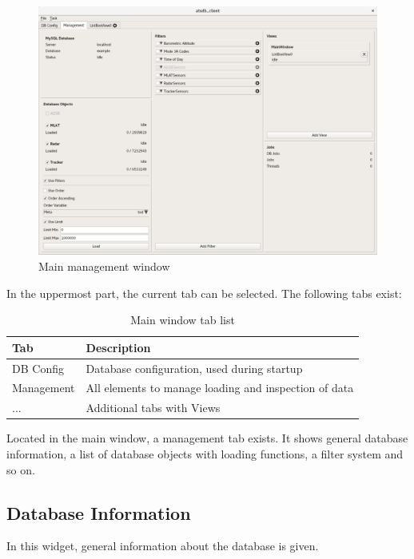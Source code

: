 \documentclass[10pt,letterpaper,extrafontsizes]{memoir}
\begin{document}
\begin{figure}[H]
  \hspace*{-2cm}
    \includegraphics[width=18cm]{../screenshots/management.png}
  \caption{Main management window}
  \label{fig:management}
\end{figure}

In the uppermost part, the current tab can be selected. The following tabs exist:

\begin{table}[h]
  \center
  \begin{tabular}{ | l | l |}
    \hline
    \textbf{Tab} & \textbf{Description} \\ \hline
    DB Config & Database configuration, used during startup \\ \hline
    Management & All elements to manage loading and inspection of data \\ \hline
    ... & Additional tabs with Views \\
    \hline
  \end{tabular}
  \caption{Main window tab list}
\end{table}

Located in the main window, a management tab exists.  It shows general database information, a list of database objects with loading functions, a filter system and so on.

\subsection{Database Information}

In this widget, general information about the database is given. 
\end{document}
